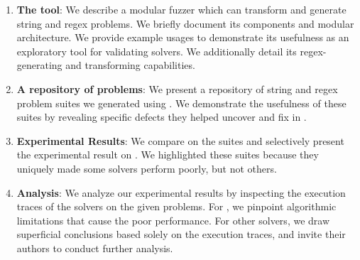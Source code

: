         \begin{enumerate}
            \item \textbf{The \fuzzer{} tool}: We describe a modular fuzzer which can transform and generate \smtfull{} string and regex problems. We briefly document its components and modular architecture. We provide example usages to demonstrate its usefulness as an exploratory tool for validating solvers. We additionally detail its regex-generating and transforming capabilities.
            \item \textbf{A repository of \smtfull{} problems}: We present a repository of \smtfull{} string and regex problem suites we generated using \fuzzer{}. We demonstrate the usefulness of these suites by revealing specific defects they helped uncover and fix in \us{}.
            \item \textbf{Experimental Results}: We compare \theSolvers{} on the \fuzzer{} suites and selectively present the experimental result on \theSuites{}. We highlighted these suites because they uniquely made some solvers perform poorly, but not others.
            \item \textbf{Analysis}: We analyze our experimental results by inspecting the execution traces of the solvers on the given problems. For \us{}, we pinpoint algorithmic limitations that cause the poor performance. For other solvers, we draw superficial conclusions based solely on the execution traces, and invite their authors to conduct further analysis.
        \end{enumerate}
